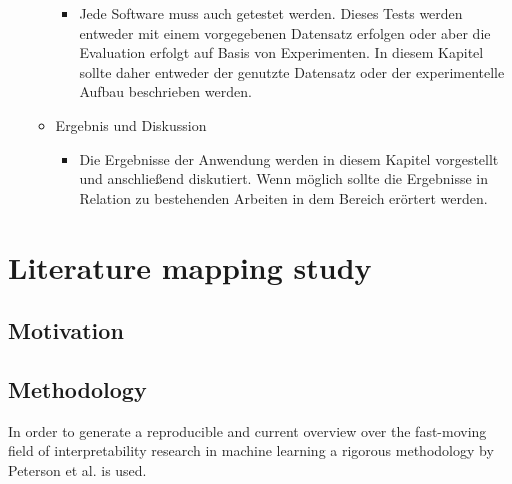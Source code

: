 \begin{itemize}
\begin{itemize}
\begin{itemize}
			\item Jede Software muss auch getestet werden. Dieses Tests werden entweder mit einem vorgegebenen Datensatz erfolgen oder aber die Evaluation erfolgt auf Basis von Experimenten. In diesem Kapitel sollte daher entweder der genutzte Datensatz oder der experimentelle Aufbau beschrieben werden. 
		\end{itemize}
		\item Ergebnis und Diskussion
		\begin{itemize}
			\item Die Ergebnisse der Anwendung werden in diesem Kapitel vorgestellt und anschließend diskutiert. Wenn möglich sollte die Ergebnisse in Relation zu bestehenden Arbeiten in dem Bereich erörtert werden.
		\end{itemize}
	\end{itemize}  
\end{itemize}

\chapter{Literature mapping study}

\section{Motivation}

\section{Methodology}
In order to generate a reproducible and current overview over the fast-moving field of interpretability research in machine learning a rigorous methodology by Peterson et al. \cite{petersenSystematicMappingStudies} is used. 

